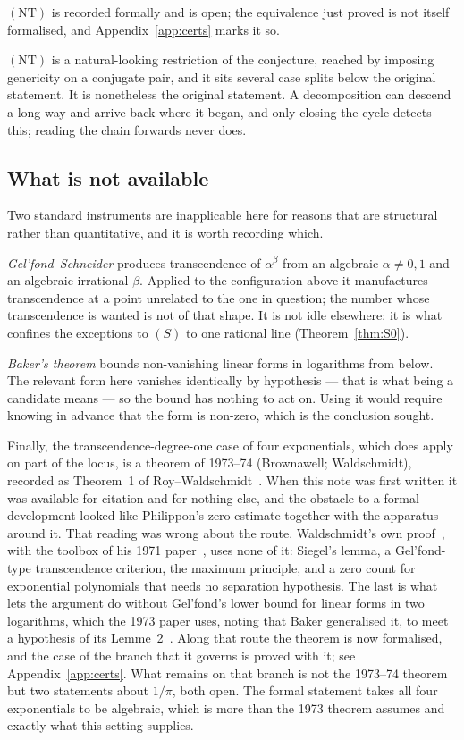 \documentclass[11pt,a4paper]{article}
\theoremstyle{plain}
\theoremstyle{definition}
\begin{document}
$(\mathrm{NT})$ is recorded formally and is open; the equivalence just proved is not itself
formalised, and Appendix~\ref{app:certs} marks it so.

$(\mathrm{NT})$ is a natural-looking restriction of the conjecture, reached by imposing
genericity on a conjugate pair, and it sits several case splits below the original statement. It
is nonetheless the original statement. A decomposition can descend a long way and arrive back
where it began, and only closing the cycle detects this; reading the chain forwards never does.

\subsection*{What is not available}

Two standard instruments are inapplicable here for reasons that are structural rather than
quantitative, and it is worth recording which.

\emph{Gel'fond--Schneider} produces transcendence of $\alpha^{\beta}$ from an algebraic
$\alpha\neq0,1$ and an algebraic irrational $\beta$. Applied to the configuration above it
manufactures transcendence at a point unrelated to the one in question; the number whose
transcendence is wanted is not of that shape. It is not idle elsewhere: it is what confines the
exceptions to $(S)$ to one rational line (Theorem~\ref{thm:S0}).

\emph{Baker's theorem} bounds non-vanishing linear forms in logarithms from below. The relevant
form here vanishes identically by hypothesis --- that is what being a candidate means --- so the
bound has nothing to act on. Using it would require knowing in advance that the form is
non-zero, which is the conclusion sought.

Finally, the transcendence-degree-one case of four exponentials, which does apply on part of the
locus, is a theorem of 1973--74 (Brownawell; Waldschmidt), recorded as Theorem~1 of
Roy--Waldschmidt~\cite{roy-waldschmidt-1995}. When this note was first written it was available
for citation and for nothing else, and the obstacle to a formal development looked like
Philippon's zero estimate together with the apparatus around it. That reading was wrong about
the route. Waldschmidt's own proof~\cite{waldschmidt-1973}, with the toolbox of his 1971
paper~\cite{waldschmidt-1971}, uses none of it: Siegel's lemma, a Gel'fond-type transcendence
criterion, the maximum principle, and a zero count for exponential polynomials that needs no
separation hypothesis. The last is what lets the argument do without Gel'fond's lower bound for
linear forms in two logarithms, which the 1973 paper uses, noting that Baker generalised it, to meet
a hypothesis of its Lemme~2~\cite[pp.~195, 199]{waldschmidt-1973}.
Along that route the theorem is now formalised, and the case of the branch that it governs is
proved with it; see Appendix~\ref{app:certs}. What remains on that branch is not the 1973--74
theorem but two statements about $1/\pi$, both open. The formal statement takes all four exponentials to be algebraic,
which is more than the 1973 theorem assumes and exactly what this setting supplies.
\end{document}
